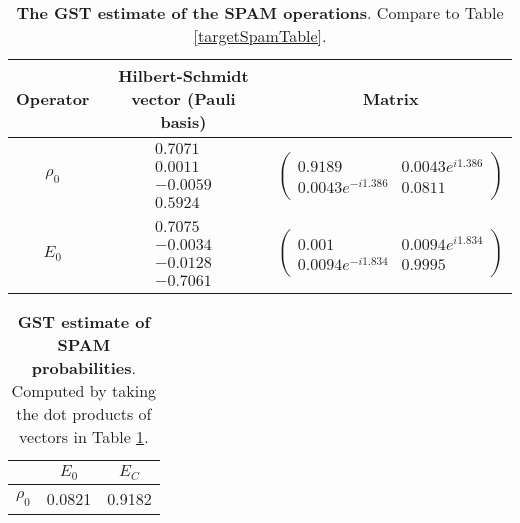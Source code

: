 {\begin{table}[h]
\begin{center}
\begin{tabular}[l]{|c|c|c|}
\hline
Operator & Hilbert-Schmidt vector (Pauli basis) & Matrix \\ \hline
$\rho_{0}$ & $ \begin{array}{c}
0.7071 \\ 
0.0011 \\ 
-0.0059 \\ 
0.5924
 \end{array} $
 & $ \left(\!\!\begin{array}{cc}
0.9189 & 0.0043e^{i1.386} \\ 
0.0043e^{-i1.386} & 0.0811
 \end{array}\!\!\right) $
 \\ \hline
$E_{0}$ & $ \begin{array}{c}
0.7075 \\ 
-0.0034 \\ 
-0.0128 \\ 
-0.7061
 \end{array} $
 & $ \left(\!\!\begin{array}{cc}
0.001 & 0.0094e^{i1.834} \\ 
0.0094e^{-i1.834} & 0.9995
 \end{array}\!\!\right) $
 \\ \hline
\end{tabular}

\caption{\textbf{The GST estimate of the SPAM operations}.  Compare to Table \ref{targetSpamTable}.\label{bestCPTPGatesetSpamTable}}
\end{center}
\end{table}

\begin{table}[h]
\begin{center}
\begin{tabular}[l]{|c|c|c|}
\hline
 & $E_{0}$ & $E_C$ \\ \hline
$\rho_{0}$ & 0.0821 & 0.9182 \\ \hline
\end{tabular}

\caption{\textbf{GST estimate of SPAM probabilities}.  Computed by taking the dot products of vectors in Table \ref{bestCPTPGatesetSpamTable}.\label{bestCPTPGatesetSpamParametersTable}}
\end{center}
\end{table}

}
